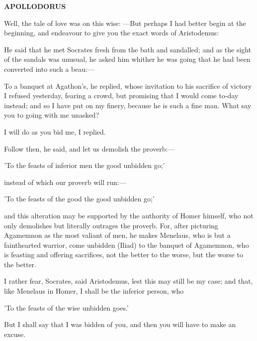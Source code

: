 \documentclass[11pt,letter]{article}
\begin{document}
\par \textbf{APOLLODORUS}
\par   Well, the tale of love was on this wise: —But perhaps I had better begin at the beginning, and endeavour to give you the exact words of Aristodemus:

\par  He said that he met Socrates fresh from the bath and sandalled; and as the sight of the sandals was unusual, he asked him whither he was going that he had been converted into such a beau:—

\par  To a banquet at Agathon's, he replied, whose invitation to his sacrifice of victory I refused yesterday, fearing a crowd, but promising that I would come to-day instead; and so I have put on my finery, because he is such a fine man. What say you to going with me unasked?

\par  I will do as you bid me, I replied.

\par  Follow then, he said, and let us demolish the proverb:—

\par  'To the feasts of inferior men the good unbidden go;'

\par  instead of which our proverb will run:—

\par  'To the feasts of the good the good unbidden go;'

\par  and this alteration may be supported by the authority of Homer himself, who not only demolishes but literally outrages the proverb. For, after picturing Agamemnon as the most valiant of men, he makes Menelaus, who is but a fainthearted warrior, come unbidden (Iliad) to the banquet of Agamemnon, who is feasting and offering sacrifices, not the better to the worse, but the worse to the better.

\par  I rather fear, Socrates, said Aristodemus, lest this may still be my case; and that, like Menelaus in Homer, I shall be the inferior person, who

\par  'To the feasts of the wise unbidden goes.'

\par  But I shall say that I was bidden of you, and then you will have to make an excuse.
\end{document}
